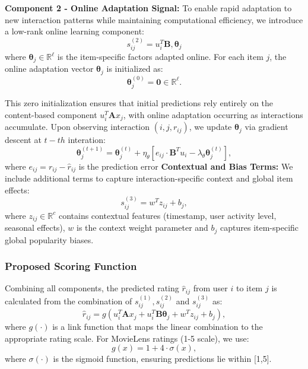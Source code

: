 \documentclass[acmsmall]{acmart}
\begin{document}
\textbf{Component 2 - Online Adaptation Signal:} To enable rapid adaptation to new interaction patterns while maintaining computational efficiency, we introduce a low-rank online learning component:
\begin{equation}
s^{(2)}_{ij} = u_i^T \mathbf{B},\boldsymbol{\theta}_j
\label{eq:online_component}
\end{equation}
where $\boldsymbol{\theta}_j \in \mathbb{R}^\ell$ is the item-specific factors adapted online. For each item $j$, the online adaptation vector $\boldsymbol{\theta}_j$ is initialized as:
\begin{equation}
\boldsymbol{\theta}_j^{(0)} = \mathbf{0} \in \mathbb{R}^\ell.
\label{eq:theta_initialization}
\end{equation}

This zero initialization ensures that initial predictions rely entirely on the content-based component $u_i^T \mathbf{A} x_j$, with online adaptation occurring as interactions accumulate. Upon observing interaction $(i,j,r_{ij})$, we update $\boldsymbol{\theta}_j$ via gradient descent at $t-th$ interation:
\begin{equation}
\boldsymbol{\theta}_j^{(t+1)} = \boldsymbol{\theta}_j^{(t)} + \eta_\theta \left[e_{ij} \cdot \mathbf{B}^T u_i - \lambda_\theta \boldsymbol{\theta}_j^{(t)}\right],
\label{eq:theta_update}
\end{equation}
where $e_{ij} = r_{ij} - \hat{r}_{ij}$ is the prediction error
\textbf{Contextual and Bias Terms:} We include additional terms to capture interaction-specific context and global item effects:
\begin{equation}
s^{(3)}_{ij} = w^T z_{ij} + b_j,
\label{eq:context_bias}
\end{equation}
where $z_{ij} \in \mathbb{R}^c$ contains contextual features (timestamp, user activity level, seasonal effects), $w$ is the context weight parameter and $b_j$ captures item-specific global popularity biases.

\subsubsection{Proposed Scoring Function}

Combining all components, the predicted rating $\hat{r}_{ij}$ from user $i$ to item $j$ is calculated from the combination of $s^{(1)}_{ij}, s^{(2)}_{ij}$  and $s^{(3)}_{ij}$ as: 
\begin{equation}
\hat{r}_{ij} = g\left(u_i^T \mathbf{A} x_j + u_i^T \mathbf{B} \boldsymbol{\theta}_j + w^T z_{ij} + b_j\right),
\label{eq:complete_scoring}
\end{equation}
where $g(\cdot)$ is a link function that maps the linear combination to the appropriate rating scale. For MovieLens ratings (1-5 scale), we use:
\begin{equation}
g(x) = 1 + 4 \cdot \sigma(x),
\label{eq:link_function}
\end{equation}
where $\sigma(\cdot)$ is the sigmoid function, ensuring predictions lie within [1,5].
\end{document}
